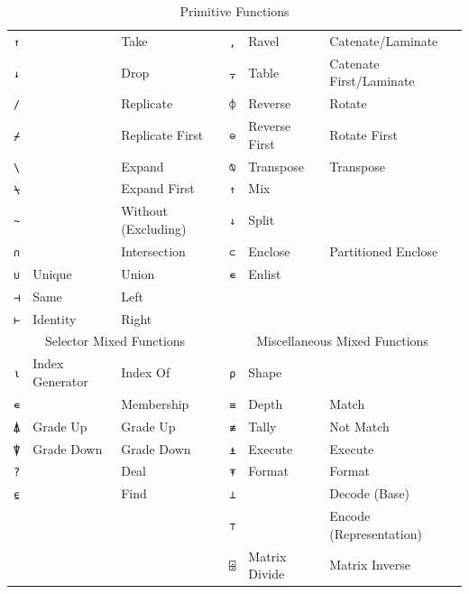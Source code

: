 ﻿\documentclass[numbers,10pt,preprint]{sigplanconf}
\begin{document}
\begin{table}
\begin{tabular}{cllcll}
\texttt{↑}               &          & Take &
\texttt{,} & Ravel         & Catenate/Laminate \\
\texttt{↓}               &          & Drop &
\texttt{⍪} & Table         & Catenate First/Laminate \\
\texttt{/}               &          & Replicate &
\texttt{⌽} & Reverse       & Rotate \\
\texttt{⌿}               &          & Replicate First &
\texttt{⊖} & Reverse First & Rotate First \\
\texttt{\textbackslash}  &          & Expand &
\texttt{⍉} & Transpose     & Transpose \\
\texttt{⍀}               &          & Expand First &
\texttt{↑} & Mix           & \\
\texttt{\textasciitilde} &          & Without (Excluding) &
\texttt{↓} & Split         & \\
\texttt{∩}               &          & Intersection &
\texttt{⊂} & Enclose       & Partitioned Enclose \\
\texttt{∪}               & Unique   & Union &
\texttt{∊} & Enlist        & \\
\texttt{⊣}               & Same     & Left \\
\texttt{⊢}               & Identity & Right\\
\midrule
\multicolumn{3}{c}{Selector Mixed Functions} &
\multicolumn{3}{c}{Miscellaneous Mixed Functions} \\
\cmidrule(r){1-3} \cmidrule(l){4-6}
\texttt{⍳} & Index Generator & Index Of &
\texttt{⍴} & Shape         & \\
\texttt{∊} &                 & Membership &
\texttt{≡} & Depth         & Match \\
\texttt{⍋} & Grade Up        & Grade Up &
\texttt{≢} & Tally         & Not Match \\
\texttt{⍒} & Grade Down      & Grade Down &
\texttt{⍎} & Execute       & Execute \\
\texttt{?} &                 & Deal &
\texttt{⍕} & Format        & Format \\
\texttt{⍷} &                 & Find &
\texttt{⊥} &               & Decode (Base) \\
& & & \texttt{⊤} &               & Encode (Representation) \\
& & & \texttt{⌹} & Matrix Divide & Matrix Inverse \\
\end{tabular}
\caption{Primitive Functions}
\label{tab:scalarprims}
\end{table}
\end{document}

